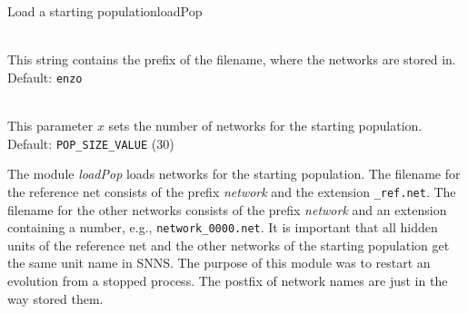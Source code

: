 \begin{moduledoc}{Load a starting population}{loadPop}
  \item[\KeyWord{network} \optParam{ x } ]~\\
    This string contains the prefix of the filename, where the networks are  
    stored in.\\ 
    Default: {\tt enzo} 
  \item[\KeyWord{popsize} \optParam{ x } ]~\\
    This parameter $x$ sets the number of networks for the starting population.\\
    Default: {\tt POP\_SIZE\_VALUE} (30)
\end{moduledoc}

The module {\it loadPop} loads networks for the starting population. 
The filename for the reference net consists of the prefix {\it network} and 
the extension {\tt \_ref.net}.
The filename for the other networks consists of the prefix {\it network} 
and an extension containing a number, e.g., \verb+network_0000.net+.
It is important that all  hidden units of the reference net and the
other networks of the starting population get the same unit name in SNNS.
The purpose of this module was to restart an evolution from a stopped
process. The postfix of network names are just in the way \ENZO stored them.
